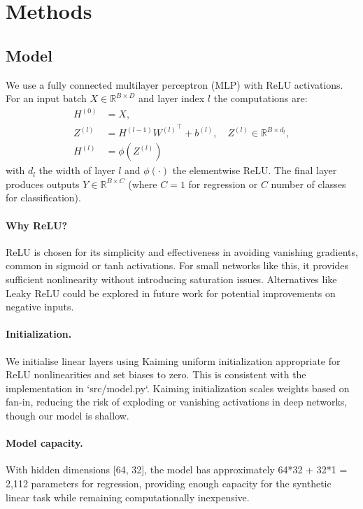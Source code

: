 \documentclass[11pt]{article}
\begin{document}
\section{Methods}
\subsection{Model}
We use a fully connected multilayer perceptron (MLP) with ReLU activations. For an input batch $X\in\mathbb{R}^{B\times D}$ and layer index $l$ the computations are:
\begin{align}
    H^{(0)} &= X, \\
    Z^{(l)} &= H^{(l-1)} {W^{(l)}}^{\top} + b^{(l)}, \quad Z^{(l)} \in \mathbb{R}^{B\times d_l}, \\
    H^{(l)} &= \phi(Z^{(l)})
\end{align}
with $d_l$ the width of layer $l$ and $\phi(\cdot)$ the elementwise ReLU. The final layer produces outputs $Y\in\mathbb{R}^{B\times C}$ (where $C=1$ for regression or $C$ number of classes for classification).

\paragraph{Why ReLU?} ReLU is chosen for its simplicity and effectiveness in avoiding vanishing gradients, common in sigmoid or tanh activations. For small networks like this, it provides sufficient nonlinearity without introducing saturation issues. Alternatives like Leaky ReLU could be explored in future work for potential improvements on negative inputs.

\paragraph{Initialization.} We initialise linear layers using Kaiming uniform initialization appropriate for ReLU nonlinearities and set biases to zero. This is consistent with the implementation in `src/model.py`. Kaiming initialization scales weights based on fan-in, reducing the risk of exploding or vanishing activations in deep networks, though our model is shallow.

\paragraph{Model capacity.} With hidden dimensions [64, 32], the model has approximately 64*32 + 32*1 = 2,112 parameters for regression, providing enough capacity for the synthetic linear task while remaining computationally inexpensive.
\end{document}

